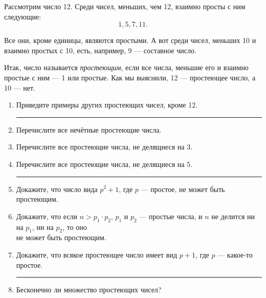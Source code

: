 ﻿
\def\lne{\medskip \\ \rule{0.65\textwidth}{0.028cm}}

\noindent Рассмотрим число 12. Среди чисел, меньших, чем 12, взаимно просты с ним следующие:
\vspace{-0.2cm}
$$1, 5, 7, 11.$$

\vspace{-0.2cm}
\noindent Все они, кроме единицы, являются простыми. А вот среди чисел, меньших 10 и взаимно простых с 10, есть, например, 9 — составное число.

\ms Итак, число называется {\itshape простеющим}, если все числа, меньшие его и взаимно простые с ним — 1 или простые. Как мы выяснили, 12 — простеющее число, а 10 — нет.

\begin{enumerate}

\vspace{0.25cm}
\item Приведите примеры других простеющих чисел, кроме 12.
\lne

\item Перечислите все нечётные простеющие числа.
\item Перечислите все простеющие числа, не делящиеся на 3.
\item Перечислите все простеющие числа, не делящиеся на 5.
\lne

\item Докажите, что число вида $p^2 + 1$, где $p$ — простое, не может быть простеющим.
\item Докажите, что если $n > p_1 \cdot p_2$, $p_1$ и $p_2$ — простые числа, и $n$ не делится ни на $p_1$, ни на $p_2$, то оно \\ не может быть простеющим.
\item Докажите, что всякое простеющее число имеет вид $p+1$, где $p$ — какое-то простое.
\lne

\item Бесконечно ли множество простеющих чисел?
\end{enumerate}